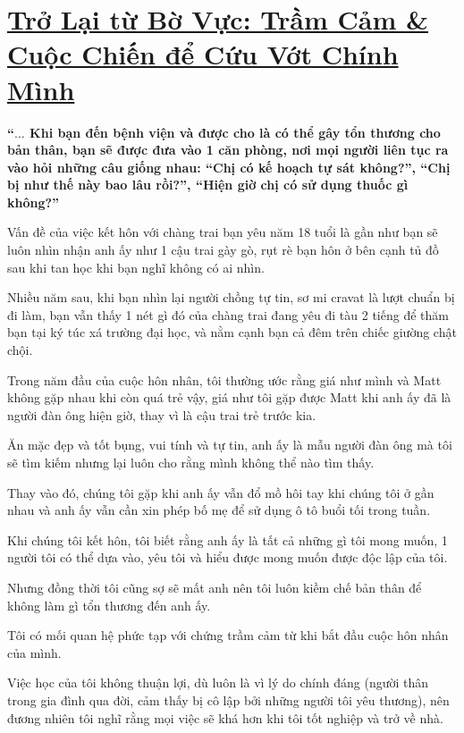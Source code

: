 \documentclass{book}
\numberwithin{equation}{section}
\begin{document}

\chapter{\href{http://tramdoc.vn/tin-tuc/tro-lai-tu-bo-vuc-tram-cam-va-cuoc-chien-de-cuu-vot-chinh-minh-nYDm9W.html}{Trở Lại từ Bờ Vực: Trầm Cảm \& Cuộc Chiến để Cứu Vớt Chính Mình}}

\textbf{``$\ldots$ Khi bạn đến bệnh viện và được cho là có thể gây tổn thương cho bản thân, bạn sẽ được đưa vào 1 căn phòng, nơi mọi người liên tục ra vào hỏi những câu giống nhau: ``Chị có kế hoạch tự sát không?'', ``Chị bị như thế này bao lâu rồi?'', ``Hiện giờ chị có sử dụng thuốc gì không?''}

%
Vấn đề của việc kết hôn với chàng trai bạn yêu năm 18 tuổi là gần như bạn sẽ luôn nhìn nhận anh ấy như 1 cậu trai gày gò, rụt rè bạn hôn ở bên cạnh tủ đồ sau khi tan học khi bạn nghĩ không có ai nhìn.

Nhiều năm sau, khi bạn nhìn lại người chồng tự tin, sơ mi cravat là lượt chuẩn bị đi làm, bạn vẫn thấy 1 nét gì đó của chàng trai đang yêu đi tàu 2 tiếng để thăm bạn tại ký túc xá trường đại học, và nằm cạnh bạn cả đêm trên chiếc giường chật chội.

%
Trong năm đầu của cuộc hôn nhân, tôi thường ước rằng giá như mình và Matt không gặp nhau khi còn quá trẻ vậy, giá như tôi gặp được Matt khi anh ấy đã là người đàn ông hiện giờ, thay vì là cậu trai trẻ trước kia.

Ăn mặc đẹp và tốt bụng, vui tính và tự tin, anh ấy là mẫu người đàn ông mà tôi sẽ tìm kiếm nhưng lại luôn cho rằng mình không thể nào tìm thấy.

%
Thay vào đó, chúng tôi gặp khi anh ấy vẫn đổ mồ hôi tay khi chúng tôi ở gần nhau và anh ấy vẫn cần xin phép bố mẹ để sử dụng ô tô buổi tối trong tuần.

Khi chúng tôi kết hôn, tôi biết rằng anh ấy là tất cả những gì tôi mong muốn, 1 người tôi có thể dựa vào, yêu tôi và hiểu được mong muốn được độc lập của tôi.

Nhưng đồng thời tôi cũng sợ sẽ mất anh nên tôi luôn kiềm chế bản thân để không làm gì tổn thương đến anh ấy.

%
Tôi có mối quan hệ phức tạp với chứng trầm cảm từ khi bắt đầu cuộc hôn nhân của mình.

Việc học của tôi không thuận lợi, dù luôn là vì lý do chính đáng (người thân trong gia đình qua đời, cảm thấy bị cô lập bởi những người tôi yêu thương), nên đương nhiên tôi nghĩ rằng mọi việc sẽ khá hơn khi tôi tốt nghiệp và trở về nhà.
\end{document}
